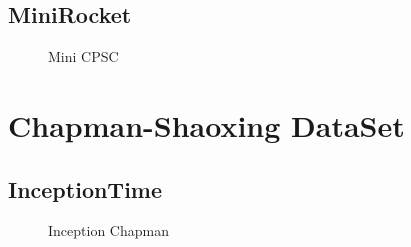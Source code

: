 \documentclass{article}
\begin{document}

\subsection{MiniRocket}
\begin{figure}[htbp]
  \caption{Mini CPSC}\label{fig:mini_cpsc}
\end{figure}
\section{Chapman-Shaoxing DataSet}

\subsection{InceptionTime}
\begin{figure}[htbp]
  \caption{Inception Chapman}\label{fig:inception_chapman}
\end{figure}
\end{document}
